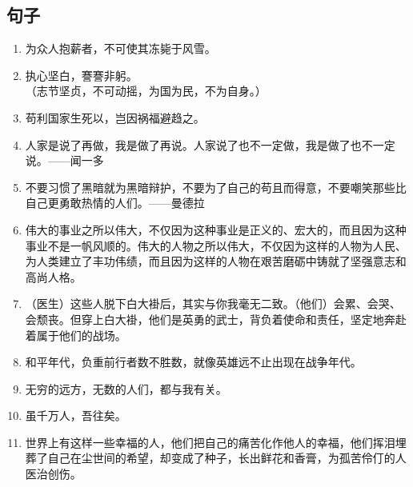 \subsection{句子}
\begin{enumerate}
\item 为众人抱薪者，不可使其冻毙于风雪。
\item 执心坚白，謇謇非躬。\\
（志节坚贞，不可动摇，为国为民，不为自身。）
\item 苟利国家生死以，岂因祸福避趋之。
\item 人家是说了再做，我是做了再说。人家说了也不一定做，我是做了也不一定说。\hfill ——闻一多
\item 不要习惯了黑暗就为黑暗辩护，不要为了自己的苟且而得意，不要嘲笑那些比自己更勇敢热情的人们。\hfill ——曼德拉
\item 伟大的事业之所以伟大，不仅因为这种事业是正义的、宏大的，而且因为这种事业不是一帆风顺的。伟大的人物之所以伟大，不仅因为这样的人物为人民、为人类建立了丰功伟绩，而且因为这样的人物在艰苦磨砺中铸就了坚强意志和高尚人格。
\item （医生）这些人脱下白大褂后，其实与你我毫无二致。（他们）会累、会哭、会颓丧。但穿上白大褂，他们是英勇的武士，背负着使命和责任，坚定地奔赴着属于他们的战场。
\item 和平年代，负重前行者数不胜数，就像英雄远不止出现在战争年代。
\item 无穷的远方，无数的人们，都与我有关。
\item 虽千万人，吾往矣。
\item 世界上有这样一些幸福的人，他们把自己的痛苦化作他人的幸福，他们挥泪埋葬了自己在尘世间的希望，却变成了种子，长出鲜花和香膏，为孤苦伶仃的人医治创伤。
\end{enumerate}

